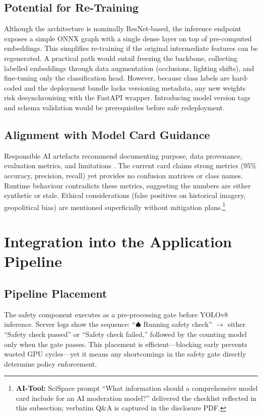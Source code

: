 \documentclass[conference]{IEEEtran}
\begin{document}
\subsection{Potential for Re-Training}
Although the architecture is nominally ResNet-based, the inference endpoint exposes a simple ONNX graph with a single dense layer on top of pre-computed embeddings. This simplifies re-training if the original intermediate features can be regenerated. A practical path would entail freezing the backbone, collecting labelled embeddings through data augmentation (occlusions, lighting shifts), and fine-tuning only the classification head. However, because class labels are hard-coded and the deployment bundle lacks versioning metadata, any new weights risk desynchronising with the FastAPI wrapper. Introducing model version tags and schema validation would be prerequisites before safe redeployment.

\subsection{Alignment with Model Card Guidance}
Responsible AI artefacts recommend documenting purpose, data provenance, evaluation metrics, and limitations \cite{mitchell2019modelcards, gebru2021datasheets, huggingface2023modelcards}. The current card claims strong metrics (95\% accuracy, precision, recall) yet provides no confusion matrices or class names. Runtime behaviour contradicts these metrics, suggesting the numbers are either synthetic or stale. Ethical considerations (false positives on historical imagery, geopolitical bias) are mentioned superficially without mitigation plans.\footnote{\textbf{AI-Tool:} SciSpace prompt ``What information should a comprehensive model card include for an AI moderation model?'' delivered the checklist reflected in this subsection; verbatim Q\&A is captured in the disclosure PDF.}

\section{Integration into the Application Pipeline}
\subsection{Pipeline Placement}
The safety component executes as a pre-processing gate before YOLOv8 inference. Server logs show the sequence: ``\(\spadesuit\) Running safety check'' $\rightarrow$ either ``Safety check passed'' or ``Safety check failed,'' followed by the counting model only when the gate passes. This placement is efficient---blocking early prevents wasted GPU cycles---yet it means any shortcomings in the safety gate directly determine policy enforcement.
\end{document}
